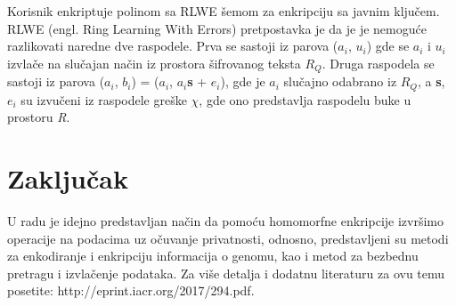 \documentclass[a4paper]{article}
\begin{document}
Korisnik enkriptuje polinom sa RLWE šemom za enkripciju sa javnim ključem. 
RLWE (engl. Ring Learning With Errors) pretpostavka je da je je nemoguće razlikovati naredne dve raspodele. Prva se sastoji iz parova ($a_i$, $u_i$) gde se $a_i$ i $u_i$ izvlače na slučajan način iz prostora šifrovanog teksta $R_Q$. Druga raspodela se sastoji iz parova ($a_i$, $b_i$) = ($a_i$, $a_i$\textbf{s} + $e_i$), gde je $a_i$ slučajno odabrano iz $R_Q$, a \textbf{s}, $e_i$ su izvučeni iz raspodele greške $\chi$, gde ono predstavlja raspodelu buke u prostoru \textit{R}.
\section{Zaključak}
\label{sec:zakljucak}
U radu je idejno predstavljan način da pomoću homomorfne enkripcije izvršimo operacije na podacima uz očuvanje privatnosti, odnosno, predstavljeni su metodi za enkodiranje i enkripciju informacija o genomu, kao i metod za bezbednu pretragu i izvlačenje podataka. Za više detalja i dodatnu literaturu za ovu temu posetite: http://eprint.iacr.org/2017/294.pdf.


\appendix
 

\end{document}
